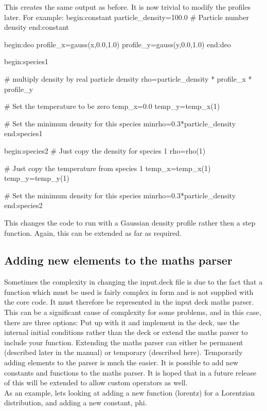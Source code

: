 \documentclass[12pt,a4paper]{article}
\newcommand{\EPOCH}{{\color{warwickdark}\fontfamily{phv}\selectfont{EPOCH}}}
\newenvironment{boxverbatim}{\lboxverbatim{none}}{\endlboxverbatim}
\begin{document}
This creates the same output as before. It is now trivial to modify the
profiles later. For example:
\begin{boxverbatim}
begin:constant
   particle_density=100.0 # Particle number density
end:constant

begin:deo
   profile_x=gauss(x,0.0,1.0)
   profile_y=gauss(y,0.0,1.0)
end:deo

begin:species1

   # multiply density by real particle density
   rho=particle_density * profile_x * profile_y

   # Set the temperature to be zero
   temp_x=0.0
   temp_y=temp_x(1)

   # Set the minimum density for this species
   minrho=0.3*particle_density
end:species1

begin:species2
   # Just copy the density for species 1
   rho=rho(1)

   # Just copy the temperature from species 1
   temp_x=temp_x(1)
   temp_y=temp_y(1)

   # Set the minimum density for this species
   minrho=0.3*particle_density
end:species2
\end{boxverbatim}

This changes the code to run with a Gaussian density profile rather then a step
function. Again, this can be extended as far as required.

\subsection{Adding new elements to the maths parser}
Sometimes the complexity in changing the input.deck file is due to the fact that
a function which must be used is fairly complex in form and is not supplied
with the core code. It must therefore be represented in the input deck maths
parser. This can be a significant cause of complexity for some problems, and
in this case, there are three options: Put up with it and implement in the
deck, use the internal initial conditions rather than the deck or extend the
maths parser to include your function. Extending the maths parser can either
be permanent (described later in the manual) or temporary (described
here). Temporarily adding elements to the parser is much the easier. It is
possible to add new constants and functions to the maths parser. It is hoped
that in a future release of {\EPOCH} this will be extended to allow custom
operators as well.\\

As an example, lets looking at adding a new function (lorentz) for a
Lorentzian distribution, and adding a new constant, phi.
\end{document}
